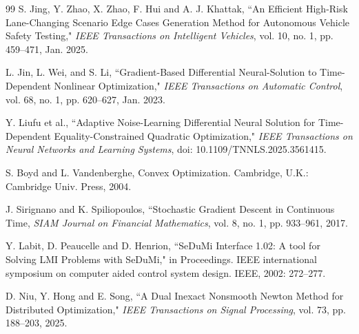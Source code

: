 \documentclass[fleqn,10pt]{wlscirep}
\begin{document}
\begin{thebibliography}{99}
 S. Jing, Y. Zhao, X. Zhao, F. Hui and A. J. Khattak, ``An Efficient High-Risk Lane-Changing Scenario Edge Cases Generation Method for Autonomous Vehicle Safety Testing," \emph{IEEE Transactions on Intelligent Vehicles}, vol. 10, no. 1, pp. 459--471, Jan. 2025.


 L. Jin, L. Wei, and S. Li, ``Gradient-Based Differential Neural-Solution to Time-Dependent Nonlinear Optimization," \emph{IEEE Transactions on Automatic Control}, vol. 68, no. 1, pp. 620--627, Jan. 2023.

 Y. Liufu et al., ``Adaptive Noise-Learning Differential Neural Solution for Time-Dependent Equality-Constrained Quadratic Optimization," \emph{IEEE Transactions on Neural Networks and Learning Systems}, doi: 10.1109/TNNLS.2025.3561415.


 S. Boyd and L. Vandenberghe, Convex Optimization. Cambridge, U.K.: Cambridge Univ. Press, 2004.

 J. Sirignano and K. Spiliopoulos, ``Stochastic Gradient Descent in Continuous Time, \emph{SIAM Journal on Financial Mathematics}, vol. 8, no. 1, pp. 933--961, 2017.

 Y. Labit, D. Peaucelle and D. Henrion, ``SeDuMi Interface 1.02: A tool for Solving LMI Problems with SeDuMi," in Proceedings. IEEE international symposium on computer aided control system design. IEEE, 2002: 272--277.

 D. Niu, Y. Hong and E. Song, ``A Dual Inexact Nonsmooth Newton Method for Distributed Optimization," \emph{IEEE Transactions on Signal Processing}, vol. 73, pp. 188--203, 2025.
\end{thebibliography}
\end{document}
